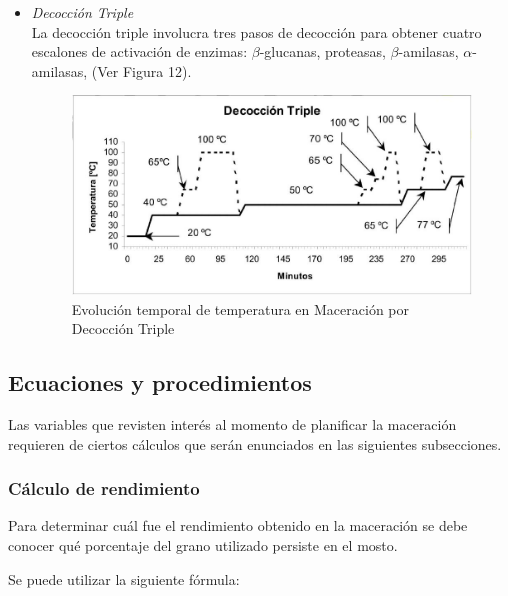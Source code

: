 \begin{itemize}
                    \item \textit{Decocción Triple} \\ La decocción triple involucra tres pasos de decocción para obtener cuatro escalones de activación de enzimas: $\beta$-glucanas, proteasas, $\beta$-amilasas, $\alpha$-amilasas, (Ver Figura 12).
                    
                        \begin{figure} [H]		                                                            \centerline{\includegraphics[scale=0.5]{decoccion_triple.jpg}}
                        \caption{Evolución temporal de temperatura en Maceración por Decocción Triple}
                        \label{MaceracionDecoccionTriple}
                        \end{figure}
                    
                \end{itemize}
        \subsection{Ecuaciones y procedimientos}
            \par Las variables que revisten interés al momento de planificar la maceración requieren de ciertos cálculos que serán enunciados en las siguientes subsecciones. 
            
            \subsubsection{Cálculo de rendimiento }
                \par Para determinar cuál fue el rendimiento obtenido en la maceración se debe conocer qué porcentaje del grano utilizado persiste en el mosto.
                
                \par Se puede utilizar la siguiente fórmula: 
                
